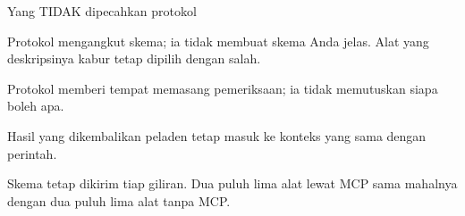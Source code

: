 \documentclass[aspectratio=169,11pt,t]{beamer}
\begin{document}
\begin{frame}[shrink=25]{Yang TIDAK dipecahkan protokol}
\begin{minipage}[t]{0.494\textwidth}
\begin{icardbad}
Protokol mengangkut skema; ia tidak membuat skema Anda jelas. Alat yang deskripsinya kabur tetap dipilih dengan salah.
\end{icardbad}
\end{minipage}%
\hfill
\begin{minipage}[t]{0.494\textwidth}
\begin{icardbad}
Protokol memberi tempat memasang pemeriksaan; ia tidak memutuskan siapa boleh apa.
\end{icardbad}
\end{minipage}%


\vskip 4pt

\begin{minipage}[t]{0.494\textwidth}
\begin{icardbad}
Hasil yang dikembalikan peladen tetap masuk ke konteks yang sama dengan perintah.
\end{icardbad}
\end{minipage}%
\hfill
\begin{minipage}[t]{0.494\textwidth}
\begin{icardbad}
Skema tetap dikirim tiap giliran. Dua puluh lima alat lewat MCP sama mahalnya dengan dua puluh lima alat tanpa MCP.
\end{icardbad}
\end{minipage}%
\end{frame}
\end{document}
